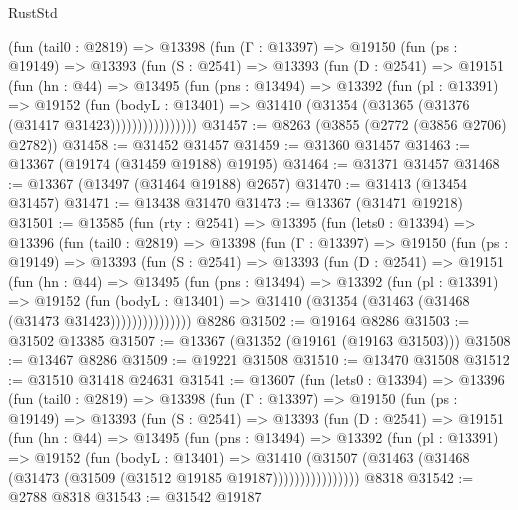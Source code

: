 \begin{lexlean}{RustStd}
\begin{coremodule}
          (fun (tail0 : @2819) =>
          @13398
            (fun (Γ : @13397) =>
            @19150
              (fun (ps : @19149) =>
              @13393
                (fun (S : @2541) =>
                @13393
                  (fun (D : @2541) =>
                  @19151
                    (fun (hn : @44) =>
                    @13495
                      (fun (pns : @13494) =>
                      @13392
                        (fun (pl : @13391) =>
                        @19152
                          (fun (bodyL : @13401) =>
                          @31410 (@31354 (@31365 (@31376 (@31417 @31423))))))))))))))))
@31457 := @8263 (@3855 (@2772 (@3856 @2706) @2782))
@31458 := @31452 @31457
@31459 := @31360 @31457
@31463 := @13367 (@19174 (@31459 @19188) @19195)
@31464 := @31371 @31457
@31468 := @13367 (@13497 (@31464 @19188) @2657)
@31470 := @31413 (@13454 @31457)
@31471 := @13438 @31470
@31473 := @13367 (@31471 @19218)
@31501 := @13585
    (fun (rty : @2541) =>
    @13395
      (fun (lets0 : @13394) =>
      @13396
        (fun (tail0 : @2819) =>
        @13398
          (fun (Γ : @13397) =>
          @19150
            (fun (ps : @19149) =>
            @13393
              (fun (S : @2541) =>
              @13393
                (fun (D : @2541) =>
                @19151
                  (fun (hn : @44) =>
                  @13495
                    (fun (pns : @13494) =>
                    @13392
                      (fun (pl : @13391) =>
                      @19152
                        (fun (bodyL : @13401) =>
                        @31410 (@31354 (@31463 (@31468 (@31473 @31423)))))))))))))))
    @8286
@31502 := @19164 @8286
@31503 := @31502 @13385
@31507 := @13367 (@31352 (@19161 (@19163 @31503)))
@31508 := @13467 @8286
@31509 := @19221 @31508
@31510 := @13470 @31508
@31512 := @31510 @31418 @24631
@31541 := @13607
    (fun (lets0 : @13394) =>
    @13396
      (fun (tail0 : @2819) =>
      @13398
        (fun (Γ : @13397) =>
        @19150
          (fun (ps : @19149) =>
          @13393
            (fun (S : @2541) =>
            @13393
              (fun (D : @2541) =>
              @19151
                (fun (hn : @44) =>
                @13495
                  (fun (pns : @13494) =>
                  @13392
                    (fun (pl : @13391) =>
                    @19152
                      (fun (bodyL : @13401) =>
                      @31410
                        (@31507
                          (@31463 (@31468 (@31473 (@31509 (@31512 @19185 @19187))))))))))))))))
    @8318
@31542 := @2788 @8318
@31543 := @31542 @19187

\end{coremodule}
\end{lexlean}
